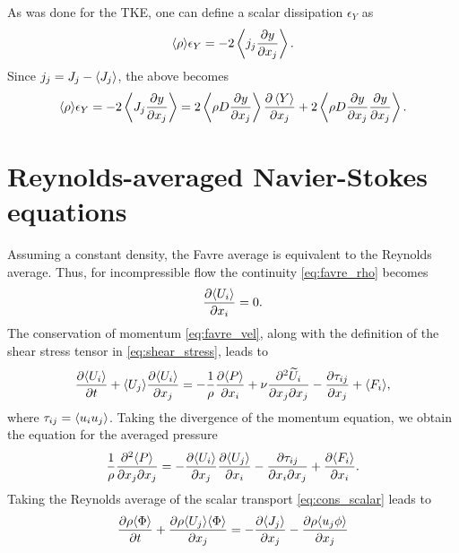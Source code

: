 \documentclass[oneside,a4paper,11pt]{report}
\begin{document}
As was done for the TKE, one can define a scalar dissipation $\epsilon_Y$ as 
\begin{equation}
    \langle \rho \rangle \epsilon_Y = -2\left < j_j \frac{\partial y}{\partial x_j} \right >.
\end{equation}
Since $j_j = J_j - \left < J_j \right >$, the above becomes
\begin{equation}
    \langle \rho \rangle \epsilon_Y = -2\left < J_j \frac{\partial y}{\partial x_j} \right > = 2 \left < \rho D \frac{\partial y}{\partial x_j} \right > \frac{\partial \left < Y \right >}{\partial x_j} + 2 \left < \rho D \frac{\partial y}{\partial x_j} \frac{\partial y}{\partial x_j} \right >.
\end{equation}


\section{Reynolds-averaged Navier-Stokes equations}
Assuming a constant density, the Favre average is equivalent to the Reynolds average. Thus, for incompressible flow the continuity \cref{eq:favre_rho} becomes
\begin{equation}
\label{eq:rans_rho}
\frac{\partial \langle U_i \rangle}{\partial x_i} = 0.
\end{equation}
The conservation of momentum \cref{eq:favre_vel}, along with the definition of the shear stress tensor in \cref{eq:shear_stress}, leads to 
\begin{equation}
\label{eq:rans_vel}
\frac{\partial \langle U_i \rangle}{\partial t} + \langle U_j \rangle \frac{\partial \langle U_i \rangle}{\partial x_j} = -\frac{1}{\rho} \frac{\partial \langle P \rangle}{\partial x_i} + \nu \frac{ \partial^2 \widetilde{U}_i }{ \partial x_j \partial x_j} - \frac{\partial \tau_{ij}}{\partial x_j} + \langle F_i \rangle,
\end{equation}
where $\tau_{ij} = \langle u_i u_j \rangle$.
Taking the divergence of the momentum equation, we obtain the equation for the averaged pressure
\begin{equation}
\label{eq:rans_pressure}
\frac{1}{\rho} \frac{\partial^2 \langle P \rangle}{\partial x_j \partial x_j} = - \frac{\partial \langle U_i \rangle}{\partial x_j} \frac{\partial \langle U_j \rangle}{\partial x_i} - \frac{\partial \tau_{ij}}{\partial x_i \partial x_j} + \frac{ \partial \langle F_i \rangle}{ \partial x_i}.
\end{equation}
Taking the Reynolds average of the scalar transport \cref{eq:cons_scalar} leads to
\begin{equation}
\label{eq:rans_scalar}
    \frac{\partial \rho \langle \Phi \rangle}{\partial t} + \frac{\partial \rho \langle U_j \rangle \langle \Phi \rangle}{\partial x_j} = -\frac{\partial \langle J_j \rangle}{\partial x_j} -\frac{\partial \rho \langle u_j \phi \rangle }{\partial x_j}
\end{equation}
\end{document}
